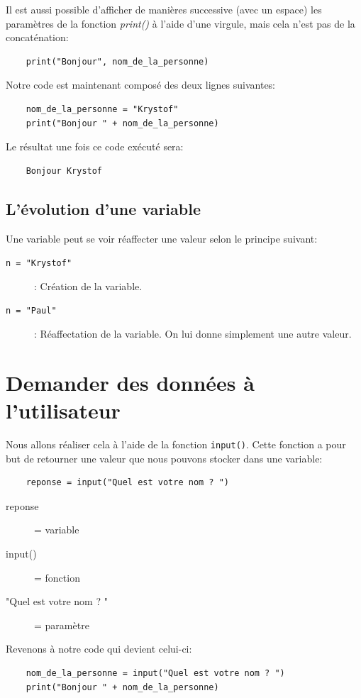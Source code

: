 \documentclass[a4paper,12pt]{book}
\begin{document}
Il est aussi possible d'afficher de manières successive (avec un espace) les paramètres de la fonction \textit{print()} à l'aide d'une virgule, mais cela n'est pas de la concaténation:
\begin{verbatim}
    print("Bonjour", nom_de_la_personne)
\end{verbatim}
\medskip

Notre code est maintenant composé des deux lignes suivantes:
\begin{lstlisting}
	nom_de_la_personne = "Krystof"
	print("Bonjour " + nom_de_la_personne)
\end{lstlisting}
\medskip

Le résultat une fois ce code exécuté sera:
\begin{verbatim}
    Bonjour Krystof
\end{verbatim}
\medskip

\subsection*{L'évolution d'une variable}
Une variable peut se voir réaffecter une valeur selon le principe suivant:
\begin{description}
	\item[\texttt{n = "Krystof"}]: Création de la variable.
	\item[\texttt{n = "Paul"}]: Réaffectation de la variable. On lui donne simplement une autre valeur.
\end{description}
\medskip

\section{Demander des données à l'utilisateur}
Nous allons réaliser cela à l'aide de la fonction \texttt{input()}. Cette fonction a pour but de retourner une valeur que nous pouvons stocker dans une variable:
\begin{verbatim}
    reponse = input("Quel est votre nom ? ")
\end{verbatim}
\begin{description}
    \item[reponse] = variable
    \item[input()] = fonction
    \item["Quel est votre nom ? "] = paramètre
\end{description}
\medskip

Revenons à notre code qui devient celui-ci:
\begin{lstlisting}
    nom_de_la_personne = input("Quel est votre nom ? ")
    print("Bonjour " + nom_de_la_personne)
\end{lstlisting}
\medskip
\end{document}
